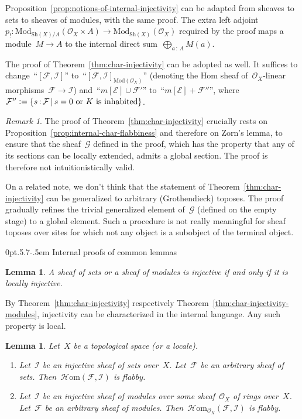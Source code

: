 \documentclass[10pt,reqno,a4paper]{amsbook}
\makeatletter
\theoremstyle{definition}
\theoremstyle{plain}
\newtheorem{lemma}[defn]{Lemma}
\theoremstyle{remark}
\newtheorem{rem}[defn]{Remark}
\newcommand{\E}{\mathcal{E}}
\newcommand{\F}{\mathcal{F}}
\renewcommand{\G}{\mathcal{G}}
\renewcommand{\O}{\mathcal{O}}
\newcommand{\I}{\mathcal{I}}
\newcommand{\HOM}{\mathcal{H}\mathrm{om}}
\newcommand{\Sh}{\mathrm{Sh}}
\newcommand{\Mod}{\mathrm{Mod}}
\newcommand{\?}{\,{:}\,}
\renewcommand{\_}{\mathpunct{.}\,}
\newcommand{\defeq}{\vcentcolon=}
\renewenvironment{proof}[1][\proofname]{\par
  \pushQED{\qed}%
  \normalfont \topsep6\p@\@plus6\p@\relax
  \trivlist
  \item[\hskip\labelsep
        \itshape
    #1\@addpunct{.}]\ignorespaces
}{%
  \popQED\endtrivlist\@endpefalse
}
\def\subsection{\@startsection{subsection}{2}%
  {0pt}{.5\linespacing\@plus.7\linespacing}{-.5em}%
  {\normalfont\bfseries}}
\makeatother
\begin{document}
\begin{proof}Proposition~\ref{prop:notions-of-internal-injectivity} can be
adapted from sheaves to sets to sheaves of modules, with the same proof.
The extra left adjoint~$p_! : \Mod_{\Sh(X)/A}(\O_X \times A) \to
\Mod_{\Sh(X)}(\O_X)$ required by the proof maps a module~$M \to A$ to the
internal direct sum~$\bigoplus_{a \? A} M(a)$.

The proof of Theorem~\ref{thm:char-injectivity} can be adopted as well.
It suffices to change~``$[\F, \I]$'' to~``$[\F,\I]_{\Mod(\O_X)}$'' (denoting
the Hom sheaf of~$\O_X$-linear morphisms~$\F \to \I$)
and~``$m[\E] \cup \F'$'' to~``$m[\E] + \F''$'', where~$\F''
\defeq \{ s \? \F \,|\, \text{$s = 0$ or $K$ is inhabited} \}$.
\end{proof}

\begin{rem}The proof of Theorem~\ref{thm:char-injectivity} crucially rests on
Proposition~\ref{prop:internal-char-flabbiness} and therefore on Zorn's lemma,
to ensure that the sheaf~$\G$ defined in the proof, which has the property that
any of its sections can be locally extended, admits a global section. The proof
is therefore not intuitionistically valid.

On a related note, we don't think that the statement of
Theorem~\ref{thm:char-injectivity} can be generalized to arbitrary
(Grothendieck) toposes. The proof gradually refines the trivial
generalized element of~$\G$ (defined on the empty stage) to a global element.
Such a procedure is not really meaningful for sheaf toposes over sites for
which not any object is a subobject of the terminal object.
\end{rem}


\subsection{Internal proofs of common lemmas}

\begin{lemma}A sheaf of sets or a sheaf of modules is injective if and only if it
is locally injective.\end{lemma}

\begin{proof}By Theorem~\ref{thm:char-injectivity} respectively
Theorem~\ref{thm:char-injectivity-modules}, injectivity can be characterized in the
internal language. Any such property is local.\end{proof}

\begin{lemma}Let~$X$ be a topological space (or a locale).
\begin{enumerate}
\item Let~$\I$ be an injective sheaf of sets over~$X$. Let~$\F$ be an arbitrary
sheaf of sets. Then~$\HOM(\F,\I)$ is flabby.
\item Let~$\I$ be an injective sheaf of modules over some sheaf~$\O_X$ of rings
over~$X$. Let~$\F$ be an arbitrary sheaf of modules.
Then~$\HOM_{\O_X}(\F,\I)$ is flabby.
\end{enumerate}
\end{lemma}
\end{document}
